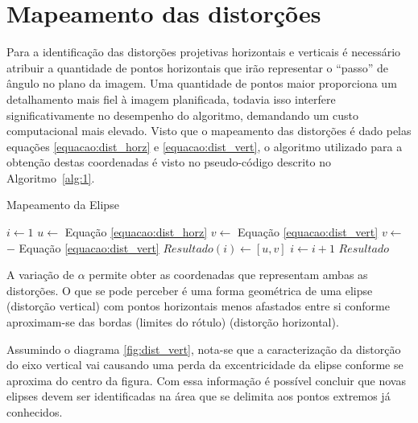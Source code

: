 \section{Mapeamento das distorções}

Para a identificação das distorções projetivas horizontais  e verticais é necessário atribuir a quantidade de pontos horizontais  que  irão representar  o  ``passo'' de ângulo  no  plano  da  imagem.   Uma  quantidade de pontos  maior  proporciona  um  detalhamento  mais  fiel à imagem  planificada,  todavia  isso interfere significativamente no desempenho do algoritmo, demandando um custo computacional mais elevado.
Visto que o mapeamento das distorções é dado pelas equações \eqref{equacao:dist_horz} e \eqref{equacao:dist_vert}, o algoritmo utilizado para a obtenção destas coordenadas é visto no pseudo-código descrito no Algoritmo~\ref{alg:1}.

\begin{algorithm}
    \caption{Mapeamento da Elipse}
    \label{alg:1}
    \begin{algorithmic}[1]
    \State $i \gets 1$
     
        \State $u \gets$ Equação \ref{equacao:dist_horz}
            \State $v \gets$ Equação \ref{equacao:dist_vert} 
        \Else
            \State $v \gets$ $-$ Equação \ref{equacao:dist_vert}
        \EndIf
    \State $Resultado(i) \gets [u, v]$
    \State $i \gets i + 1$
    \EndFor
    \State \Return  $Resultado$
    \EndFunction
    \end{algorithmic}
\end{algorithm}

A variação de $\alpha$ permite obter as coordenadas que representam ambas as distorções.  O que se pode perceber é uma forma geométrica de uma elipse (distorção vertical) com pontos horizontais menos afastados entre si conforme aproximam-se das bordas (limites do rótulo) (distorção horizontal).

Assumindo o diagrama \ref{fig:dist_vert}, nota-se que a caracterização da distorção do eixo vertical vai causando uma perda da excentricidade da elipse conforme se aproxima do centro da figura. Com essa informação é possível concluir que novas elipses devem ser identificadas na área que se delimita aos pontos extremos já conhecidos. 

